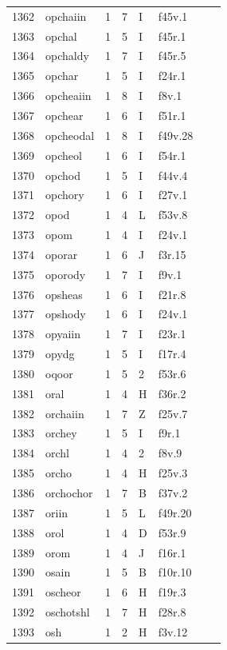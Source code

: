 \documentclass[11pt,a4paper]{article}
\begin{document}
\begin{landscape}
\begin{longtable}{@{}r>{\ttfamily}lrrl>{\ttfamily}l>{\raggedright\arraybackslash}p{80mm}>{\raggedright\arraybackslash}p{36mm}@{}}
1362 & opchaiin & 1 & 7 & I & f45v.1 &  & \\
1363 & opchal & 1 & 5 & I & f45r.1 &  & \\
1364 & opchaldy & 1 & 7 & I & f45r.5 &  & \\
1365 & opchar & 1 & 5 & I & f24r.1 &  & \\
1366 & opcheaiin & 1 & 8 & I & f8v.1 &  & \\
1367 & opchear & 1 & 6 & I & f51r.1 &  & \\
1368 & opcheodal & 1 & 8 & I & f49v.28 &  & \\
1369 & opcheol & 1 & 6 & I & f54r.1 &  & \\
1370 & opchod & 1 & 5 & I & f44v.4 &  & \\
1371 & opchory & 1 & 6 & I & f27v.1 &  & \\
1372 & opod & 1 & 4 & L & f53v.8 &  & \\
1373 & opom & 1 & 4 & I & f24v.1 &  & \\
1374 & oporar & 1 & 6 & J & f3r.15 &  & \\
1375 & oporody & 1 & 7 & I & f9v.1 &  & \\
1376 & opsheas & 1 & 6 & I & f21r.8 &  & \\
1377 & opshody & 1 & 6 & I & f24v.1 &  & \\
1378 & opyaiin & 1 & 7 & I & f23r.1 &  & \\
1379 & opydg & 1 & 5 & I & f17r.4 &  & \\
1380 & oqoor & 1 & 5 & 2 & f53r.6 &  & \\
1381 & oral & 1 & 4 & H & f36r.2 &  & \\
1382 & orchaiin & 1 & 7 & Z & f25v.7 &  & \\
1383 & orchey & 1 & 5 & I & f9r.1 &  & \\
1384 & orchl & 1 & 4 & 2 & f8v.9 &  & \\
1385 & orcho & 1 & 4 & H & f25v.3 &  & \\
1386 & orchochor & 1 & 7 & B & f37v.2 &  & \\
1387 & oriin & 1 & 5 & L & f49r.20 &  & \\
1388 & orol & 1 & 4 & D & f53r.9 &  & \\
1389 & orom & 1 & 4 & J & f16r.1 &  & \\
1390 & osain & 1 & 5 & B & f10r.10 &  & \\
1391 & oscheor & 1 & 6 & H & f19r.3 &  & \\
1392 & oschotshl & 1 & 7 & H & f28r.8 &  & \\
1393 & osh & 1 & 2 & H & f3v.12 &  & \\

\end{longtable}
\end{landscape}
\end{document}
